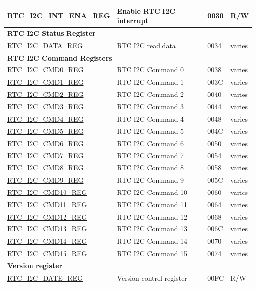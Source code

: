 \begin{longtable}{ | p{6cm} | p{7.2cm} | p{1.3cm} | p{1cm} | }
\hyperref[regdesc:RTCI2CINTENAREG]{RTC\_I2C\_INT\_ENA\_REG} & Enable RTC I2C interrupt & \hexprefix{}0030 & R/W \\ \hline
\multicolumn{4}{|l|}{\textbf{RTC I2C Status Register}} \\ \hline
\hyperref[regdesc:RTCI2CDATAREG]{RTC\_I2C\_DATA\_REG} & RTC I2C read data & \hexprefix{}0034 & varies \\ \hline
\multicolumn{4}{|l|}{\textbf{RTC I2C Command Registers}} \\ \hline
\hyperref[regdesc:RTCI2CCMD0REG]{RTC\_I2C\_CMD0\_REG} & RTC I2C Command 0 & \hexprefix{}0038 & varies \\ \hline
\hyperref[regdesc:RTCI2CCMD1REG]{RTC\_I2C\_CMD1\_REG} & RTC I2C Command 1 & \hexprefix{}003C & varies \\ \hline
\hyperref[regdesc:RTCI2CCMD2REG]{RTC\_I2C\_CMD2\_REG} & RTC I2C Command 2 & \hexprefix{}0040 & varies \\ \hline
\hyperref[regdesc:RTCI2CCMD3REG]{RTC\_I2C\_CMD3\_REG} & RTC I2C Command 3 & \hexprefix{}0044 & varies \\ \hline
\hyperref[regdesc:RTCI2CCMD4REG]{RTC\_I2C\_CMD4\_REG} & RTC I2C Command 4 & \hexprefix{}0048 & varies \\ \hline
\hyperref[regdesc:RTCI2CCMD5REG]{RTC\_I2C\_CMD5\_REG} & RTC I2C Command 5 & \hexprefix{}004C & varies \\ \hline
\hyperref[regdesc:RTCI2CCMD6REG]{RTC\_I2C\_CMD6\_REG} & RTC I2C Command 6 & \hexprefix{}0050 & varies \\ \hline
\hyperref[regdesc:RTCI2CCMD7REG]{RTC\_I2C\_CMD7\_REG} & RTC I2C Command 7 & \hexprefix{}0054 & varies \\ \hline
\hyperref[regdesc:RTCI2CCMD8REG]{RTC\_I2C\_CMD8\_REG} & RTC I2C Command 8 & \hexprefix{}0058 & varies \\ \hline
\hyperref[regdesc:RTCI2CCMD9REG]{RTC\_I2C\_CMD9\_REG} & RTC I2C Command 9 & \hexprefix{}005C & varies \\ \hline
\hyperref[regdesc:RTCI2CCMD10REG]{RTC\_I2C\_CMD10\_REG} & RTC I2C Command 10 & \hexprefix{}0060 & varies \\ \hline
\hyperref[regdesc:RTCI2CCMD11REG]{RTC\_I2C\_CMD11\_REG} & RTC I2C Command 11 & \hexprefix{}0064 & varies \\ \hline
\hyperref[regdesc:RTCI2CCMD12REG]{RTC\_I2C\_CMD12\_REG} & RTC I2C Command 12 & \hexprefix{}0068 & varies \\ \hline
\hyperref[regdesc:RTCI2CCMD13REG]{RTC\_I2C\_CMD13\_REG} & RTC I2C Command 13 & \hexprefix{}006C & varies \\ \hline
\hyperref[regdesc:RTCI2CCMD14REG]{RTC\_I2C\_CMD14\_REG} & RTC I2C Command 14 & \hexprefix{}0070 & varies \\ \hline
\hyperref[regdesc:RTCI2CCMD15REG]{RTC\_I2C\_CMD15\_REG} & RTC I2C Command 15 & \hexprefix{}0074 & varies \\ \hline
\multicolumn{4}{|l|}{\textbf{Version register}} \\ \hline
\hyperref[regdesc:RTCI2CDATEREG]{RTC\_I2C\_DATE\_REG} & Version control register & \hexprefix{}00FC & R/W \\ \hline
\end{longtable}

